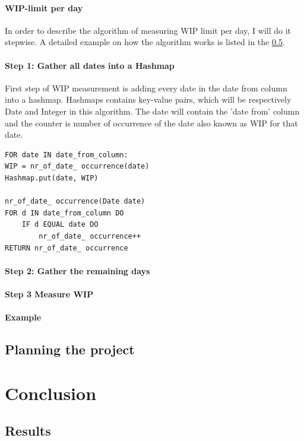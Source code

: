 \documentclass[UKenglish]{ifimaster}  %
\begin{document}
\subsection {WIP-limit per day}
In order to describe the algorithm of measuring WIP limit per day, I will do it stepwise.  A detailed example on how the algorithm works is listed in the \ref{sec:Example}.

\subsection{Step 1: Gather all dates into a Hashmap}
First step of WIP measurement is adding every date in the date from column into a hashmap. Hashmaps contains key-value pairs, which will be respectively Date and Integer in this algorithm.  The date will contain the 'date from' column and the counter is number of occurrence of the date also known as WIP for that date. 
 \begin{lstlisting}
FOR date IN date_from_column:
WIP = nr_of_date_ occurrence(date)
Hashmap.put(date, WIP)

nr_of_date_ occurrence(Date date) 
FOR d IN date_from_column DO
	IF d EQUAL date DO
		nr_of_date_ occurrence++
RETURN nr_of_date_ occurrence
 \end{lstlisting}
\subsection{Step 2: Gather the remaining days}

\subsection{Step 3 Measure WIP}

\subsection{Example}
\label{sec:Example}



\chapter{Planning the project}        %


\part{Conclusion}                     %

\chapter{Results}                     %


\backmatter{}
\printbibliography
\end{document}
